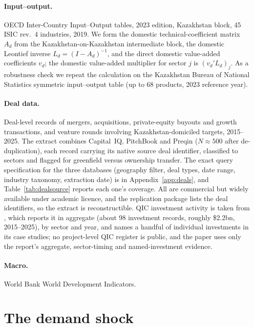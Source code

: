 \documentclass[12pt]{article}
\begin{document}
\paragraph{Input--output.} OECD Inter-Country Input--Output tables, 2023 edition, Kazakhstan
block, 45 ISIC rev.~4 industries, 2019. We form the domestic technical-coefficient matrix
$A_d$ from the Kazakhstan-on-Kazakhstan intermediate block, the domestic Leontief inverse
$L_d = (I-A_d)^{-1}$, and the direct domestic value-added coefficients $v_d$; the domestic
value-added multiplier for sector $j$ is $(v_d' L_d)_j$. As a robustness check we repeat the
calculation on the Kazakhstan Bureau of National Statistics symmetric input--output table (up
to 68 products, 2023 reference year).

\paragraph{Deal data.} Deal-level records of mergers, acquisitions, private-equity buyouts and
growth transactions, and venture rounds involving Kazakhstan-domiciled targets, 2015--2025.
The extract combines Capital~IQ, PitchBook and Preqin ($N \approx 500$ after
de-duplication), each record carrying its native source deal identifier, classified to
sectors and flagged for greenfield versus ownership transfer.
The exact query specification for the three databases (geography filter, deal types, date
range, industry taxonomy, extraction date) is in Appendix~\ref{app:deals}, and
Table~\ref{tab:dealsource} reports each one's coverage. All are commercial but widely
available under academic licence, and the replication package lists the deal identifiers, so
the extract is reconstructible. QIC investment activity is
taken from \citet{qicaifcifc2026pe}, which reports it in aggregate (about 98 investment
records, roughly \$2.2bn, 2015--2025), by sector and year, and names a handful of individual
investments in its case studies; no project-level QIC register is public, and the paper uses
only the report's aggregate, sector-timing and named-investment evidence.

\paragraph{Macro.} World Bank World Development Indicators.

\section{The demand shock}\label{sec:shock}
\end{document}
